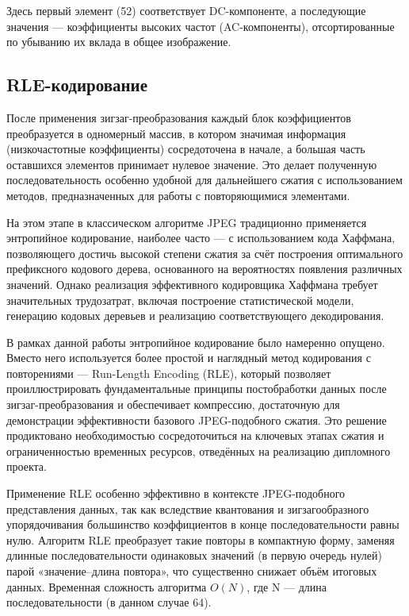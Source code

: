 Здесь первый элемент (52) соответствует DC-компоненте, а последующие значения — коэффициенты высоких частот (AC-компоненты), 
отсортированные по убыванию их вклада в общее изображение.


\subsection{RLE-кодирование}


После применения зигзаг-преобразования каждый блок коэффициентов преобразуется в одномерный массив, 
в котором значимая информация (низкочастотные коэффициенты) сосредоточена в начале, 
а большая часть оставшихся элементов принимает нулевое значение. 
Это делает полученную последовательность особенно удобной для дальнейшего сжатия с использованием методов, 
предназначенных для работы с повторяющимися элементами.

На этом этапе в классическом алгоритме JPEG традиционно применяется энтропийное кодирование, 
наиболее часто — с использованием кода Хаффмана, 
позволяющего достичь высокой степени сжатия за счёт построения оптимального префиксного кодового дерева, 
основанного на вероятностях появления различных значений. 
Однако реализация эффективного кодировщика Хаффмана требует значительных трудозатрат, 
включая построение статистической модели, генерацию кодовых деревьев и реализацию соответствующего декодирования.

В рамках данной работы энтропийное кодирование было намеренно опущено. 
Вместо него используется более простой и наглядный метод кодирования с повторениями — Run-Length Encoding (RLE), 
который позволяет проиллюстрировать фундаментальные принципы постобработки данных после зигзаг-преобразования и обеспечивает компрессию, 
достаточную для демонстрации эффективности базового JPEG-подобного сжатия. 
Это решение продиктовано необходимостью сосредоточиться на ключевых этапах сжатия и ограниченностью временных ресурсов, 
отведённых на реализацию дипломного проекта.

Применение RLE особенно эффективно в контексте JPEG-подобного представления данных, 
так как вследствие квантования и зигзагообразного упорядочивания большинство коэффициентов в конце последовательности равны нулю.
Алгоритм RLE преобразует такие повторы в компактную форму, 
заменяя длинные последовательности одинаковых значений (в первую очередь нулей) парой «значение–длина повтора», 
что существенно снижает объём итоговых данных. Временная сложность алгоритма $O(N)$, 
где N — длина последовательности (в данном случае 64).


